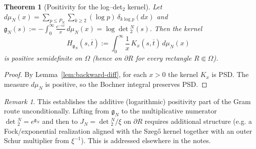 \documentclass[11pt]{article}
\newtheorem{theorem}{Theorem}
\theoremstyle{remark}
\newtheorem{remark}{Remark}
\begin{document}
\begin{theorem}[Positivity for the log--det$_2$ kernel]\label{thm:H_g_pos}
Let $d\mu_N(x)=\sum_{p\le P_N}\sum_{k\ge2}(\log p)\,\delta_{k\log p}(dx)$ and $\mathfrak g_N(s):= -\int_0^\infty \tfrac{e^{-sx}}{x}\,d\mu_N(x)=\log\det{}_2^N(s)$. Then the kernel
\[ H_{\mathfrak g_N}(s,\overline t):=\int_0^\infty \frac{1}{x}\,K_x(s,\overline t)\,d\mu_N(x)\]
is positive semidefinite on $\Omega$ (hence on $\partial R$ for every rectangle $R\Subset\Omega$).
\end{theorem}

\begin{proof}
By Lemma~\ref{lem:backward-diff}, for each $x>0$ the kernel $K_x$ is PSD. The measure $d\mu_N$ is positive, so the Bochner integral preserves PSD.
\end{proof}

\begin{remark}
This establishes the additive (logarithmic) positivity part of the Gram route unconditionally. Lifting from $\mathfrak g_N$ to the multiplicative numerator $\det{}_2^N= e^{\mathfrak g_N}$ and then to $J_N=\det{}_2^N/\xi$ on $\partial R$ requires additional structure (e.g. a Fock/exponential realization aligned with the Szeg\H{o} kernel together with an outer Schur multiplier from $\xi^{-1}$). This is addressed elsewhere in the notes.
\end{remark}
\end{document}
